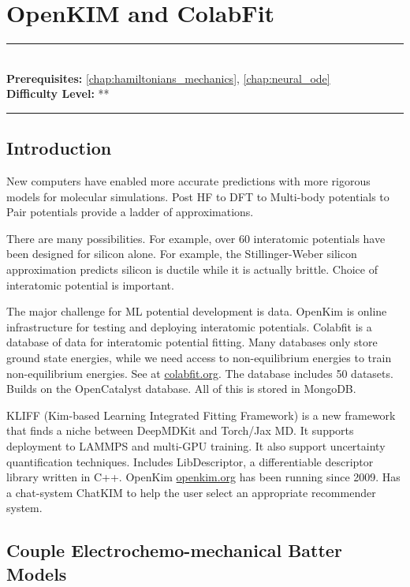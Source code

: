 \documentclass[book.tex]{subfiles}
\begin{document}
\chapter{OpenKIM and ColabFit}
\label{chap:hamiltonian_nn}
\noindent\rule{11cm}{0.4pt} \\
\textbf{Prerequisites:} \autoref{chap:hamiltonians_mechanics}, \autoref{chap:neural_ode} \\
\textbf{Difficulty Level:} ** \\
\noindent\rule{11cm}{0.4pt}
\vspace{5mm}



\section{Introduction}

New computers have enabled more accurate predictions with more rigorous models for molecular simulations. Post HF to DFT to Multi-body potentials to Pair potentials provide a ladder of approximations.

There are many possibilities. For example, over 60 interatomic potentials have been designed for silicon alone. For example, the Stillinger-Weber silicon approximation predicts silicon is ductile while it is actually brittle. Choice of interatomic potential is important.

The major challenge for ML potential development is data. OpenKim is online infrastructure for testing and deploying interatomic potentials. Colabfit is a database of data for interatomic potential fitting. Many databases only store ground state energies, while we need access to non-equilibrium energies to train non-equilibrium energies. See at \url{colabfit.org}. The database includes 50 datasets. Builds on the OpenCatalyst database. All of this is stored in MongoDB.

KLIFF (Kim-based Learning Integrated Fitting Framework) is a new framework that finds a niche between DeepMDKit and Torch/Jax MD. It supports deployment to LAMMPS and multi-GPU training. It also support uncertainty quantification techniques. Includes LibDescriptor, a differentiable descriptor library written in C++. OpenKim \url{openkim.org} has been running since 2009. Has a chat-system ChatKIM to help the user select an appropriate recommender system.


\section{Couple Electrochemo-mechanical Batter Models}
\end{document}
